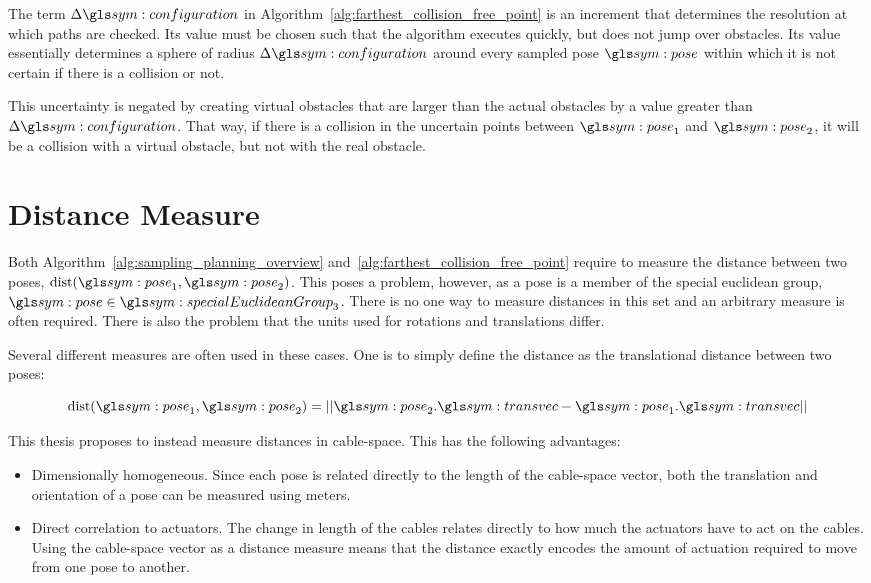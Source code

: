 		The term $\Delta\configuration$ in
		Algorithm~\ref{alg:farthest_collision_free_point} is an increment that
		determines the resolution at which paths are checked. Its value must be
		chosen such that the algorithm executes quickly, but does not jump over
		obstacles. Its value essentially determines a sphere of radius
		$\Delta\configuration$ around every sampled pose $\pose$ within which it
		is not certain if there is a collision or not.

		This uncertainty is negated by creating virtual obstacles that are
		larger than the actual obstacles by a value
		greater than $\Delta\configuration$. That way, if there is a collision
		in the uncertain points between $\pose_1$ and $\pose_2$, it will be a
		collision with a virtual obstacle, but not with the real obstacle.

	\section{Distance Measure}%
	\label{sec:distance_measure}

		Both Algorithm~\ref{alg:sampling_planning_overview}
		and~\ref{alg:farthest_collision_free_point} require to measure the
		distance between two poses, $\dist(\pose_1, \pose_2)$. This poses a
		problem, however, as a pose is a member of the special euclidean group,
		$\pose \in \specialEuclideanGroup{3}$. There is no one way to measure
		distances in this set and an arbitrary measure is often required. There
		is also the problem that the units used for rotations and translations
		differ.

		Several different measures are often used in these cases. One is to
		simply define the distance as the translational distance between two
		poses:

		\begin{equation}
			\dist(\pose_1, \pose_2) =
				\norm{%
					\pose_2.\transvec - \pose_1.\transvec
				}
		\end{equation}


		This thesis proposes to instead measure distances in cable-space. This
		has the following advantages:

		\begin{itemize}

			\item

				Dimensionally homogeneous. Since each pose is related directly
				to the length of the cable-space vector, both the translation
				and orientation of a pose can be measured using meters.

			\item

				Direct correlation to actuators. The change in length of the
				cables relates directly to how much the actuators have to act on
				the cables. Using the cable-space vector as a distance measure
				means that the distance exactly encodes the amount of actuation
				required to move from one pose to another.

		\end{itemize}

